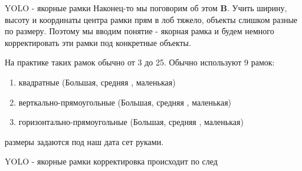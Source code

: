 \documentclass[notes,12pt, aspectratio=169]{beamer}
\begin{document}
\begin{frame}{YOLO - якорные рамки}
Наконец-то мы поговорим об этом \textbf{B}. Учить ширину, высоту и координаты центра рамки прям в лоб тяжело, объекты слишком разные по размеру. Поэтому мы вводим понятие - якорная рамка и будем немного корректировать эти рамки под конкретные объекты.

На практике таких рамок обычно от 3 до 25. Обычно используют 9 рамок:
\begin{enumerate}
	\item квадратные (Большая, средняя , маленькая)
	\item верткально-прямоугольные (Большая, средняя , маленькая)
	\item горизонтально-прямоугольные (Большая, средняя , маленькая)
\end{enumerate}
размеры задаются под наш дата сет руками.
	
\end{frame} 

\begin{frame}{YOLO - якорные рамки}
корректировка происходит по след
	
\end{frame}
\end{document}
